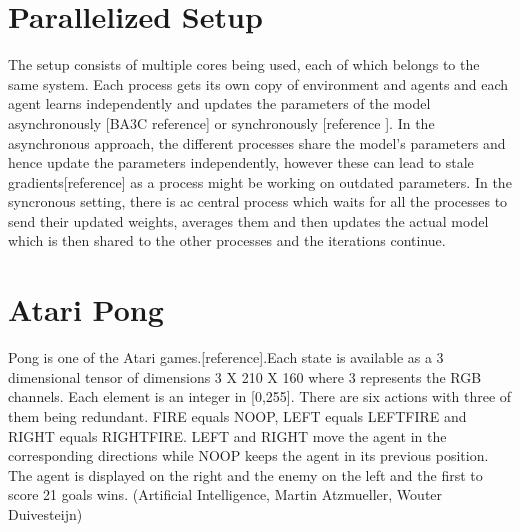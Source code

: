 \documentclass[12pt,a4]{article}
\begin{document}
\section*{Parallelized Setup}
The setup consists of multiple cores being used, each of which belongs to the same system. Each process gets its own copy of environment and agents and each agent learns independently and updates the parameters of the model asynchronously [BA3C reference] or synchronously [reference ]. In the asynchronous approach, the different processes share the model's parameters and hence update the parameters independently, however these can lead to stale gradients[reference] as a process might be working on outdated parameters. In the syncronous setting, there is ac central process which waits for all the processes to send their updated weights, averages them and then  updates the actual model which is then shared to the other processes and the iterations continue.

\section*{Atari Pong}
Pong is one of the Atari games.[reference].Each state is available as a 3 dimensional tensor of dimensions  3 X 210 X 160 where 3 represents the RGB channels. Each element is an integer in [0,255]. There are six actions with three of them being redundant. FIRE equals NOOP, LEFT equals LEFTFIRE and RIGHT equals RIGHTFIRE. LEFT and RIGHT move the agent in the corresponding directions while NOOP keeps the agent in its previous position. The agent is displayed on the right and the enemy on the left and the first to score 21 goals wins. (Artificial Intelligence, Martin Atzmueller, Wouter Duivesteijn)
\end{document}
